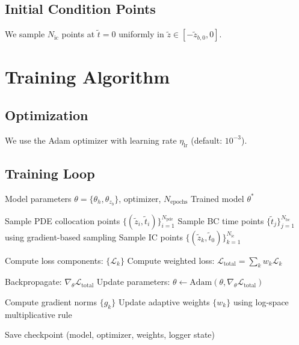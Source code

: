 \documentclass[11pt,a4paper]{article}
\begin{document}
\subsection{Initial Condition Points}

We sample $N_{\text{ic}}$ points at $\tilde{t} = 0$ uniformly in $\tilde{z} \in [-\tilde{z}_{b,0}, 0]$.

\section{Training Algorithm}

\subsection{Optimization}

We use the Adam optimizer with learning rate $\eta_{\text{lr}}$ (default: $10^{-3}$).

\subsection{Training Loop}

\begin{algorithm}
\caption{PINN Training Loop}
\begin{algorithmic}
\REQUIRE Model parameters $\theta = \{\theta_h, \theta_{z_b}\}$, optimizer, $N_{\text{epochs}}$
\ENSURE Trained model $\theta^*$

    \STATE Sample PDE collocation points $\{(\tilde{z}_i, \tilde{t}_i)\}_{i=1}^{N_{\text{pde}}}$
    \STATE Sample BC time points $\{\tilde{t}_j\}_{j=1}^{N_{\text{bc}}}$ using gradient-based sampling
    \STATE Sample IC points $\{(\tilde{z}_k, \tilde{t}_0)\}_{k=1}^{N_{\text{ic}}}$

    \STATE Compute loss components: $\{\mathcal{L}_k\}$
    \STATE Compute weighted loss: $\mathcal{L}_{\text{total}} = \sum_k w_k \mathcal{L}_k$

    \STATE Backpropagate: $\nabla_\theta \mathcal{L}_{\text{total}}$
    \STATE Update parameters: $\theta \leftarrow \text{Adam}(\theta, \nabla_\theta \mathcal{L}_{\text{total}})$

        \STATE Compute gradient norms $\{g_k\}$
        \STATE Update adaptive weights $\{w_k\}$ using log-space multiplicative rule
    \ENDIF

        \STATE Save checkpoint (model, optimizer, weights, logger state)
    \ENDIF
\ENDFOR
\end{algorithmic}
\end{algorithm}
\end{document}
